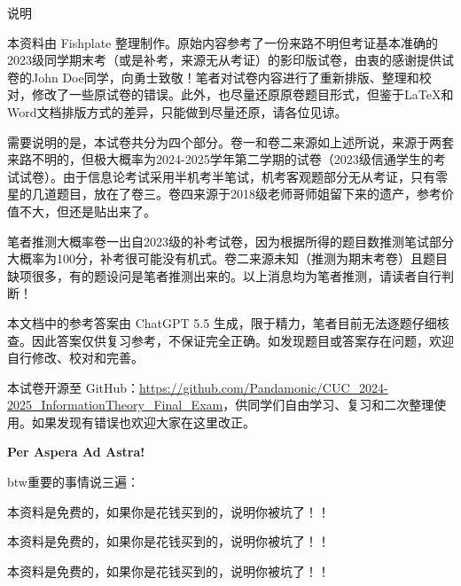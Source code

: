 \documentclass[UTF8,a4paper,12pt]{ctexart}
\begin{document}
\thispagestyle{empty}

\begin{center}
    {\heiti{} 说明}
\end{center}

\vspace{2em}

本资料由 Fishplate 整理制作。原始内容参考了一份来路不明但考证基本准确的2023级同学期末考（或是补考，来源无从考证）的影印版试卷，由衷的感谢提供试卷的John Doe同学，向勇士致敬！笔者对试卷内容进行了重新排版、整理和校对，修改了一些原试卷的错误。此外，也尽量还原原卷题目形式，但鉴于\LaTeX{}和Word文档排版方式的差异，只能做到尽量还原，请各位见谅。

\vspace{1em}

需要说明的是，本试卷共分为四个部分。卷一和卷二来源如上述所说，来源于两套来路不明的，但极大概率为2024-2025学年第二学期的试卷（2023级信通学生的考试试卷）。由于信息论考试采用半机考半笔试，机考客观题部分无从考证，只有零星的几道题目，放在了卷三。卷四来源于2018级老师哥师姐留下来的遗产，参考价值不大，但还是贴出来了。

\vspace{1em}

笔者推测大概率卷一出自2023级的补考试卷，因为根据所得的题目数推测笔试部分大概率为100分，补考很可能没有机式。卷二来源未知（推测为期末考卷）且题目缺项很多，有的题设问是笔者推测出来的。以上消息均为笔者推测，请读者自行判断！

\vspace{1em}

本文档中的参考答案由 ChatGPT 5.5 生成，限于精力，笔者目前无法逐题仔细核查。因此答案仅供复习参考，不保证完全正确。如发现题目或答案存在问题，欢迎自行修改、校对和完善。

\vspace{1em}

本试卷开源至 GitHub：\url{https://github.com/Pandamonic/CUC_2024-2025_InformationTheory_Final_Exam}，供同学们自由学习、复习和二次整理使用。如果发现有错误也欢迎大家在这里改正。

\vspace{2em}

\begin{center}

{}

{\textbf{Per Aspera Ad Astra!}}

\vspace{1em}

{\heiti btw重要的事情说三遍：}

\vspace{1em}

{\heiti 本资料是免费的，如果你是花钱买到的，说明你被坑了！！}

{\heiti 本资料是免费的，如果你是花钱买到的，说明你被坑了！！}

{\heiti 本资料是免费的，如果你是花钱买到的，说明你被坑了！！}

\end{center}
\end{document}
